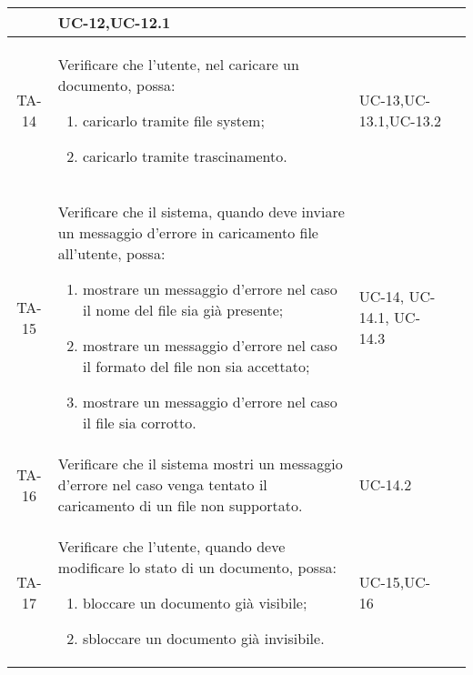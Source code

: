 \begin{xltabular}{\textwidth}{| c | X | X | c |}
\begin{enumerate}
    \end{enumerate}& UC-12,\newline UC-12.1 & \textcolor{cmarkcolor}{} \\
    \hline
    TA-14 & Verificare che l’utente, nel caricare un documento, possa:
    \begin{enumerate}
        \item caricarlo tramite file system;
        \item caricarlo tramite trascinamento.
    \end{enumerate}& UC-13,\newline UC-13.1,\newline UC-13.2 & \textcolor{cmarkcolor}{} \\
    \hline
    TA-15 & Verificare che il sistema, quando deve inviare un messaggio d'errore in caricamento file all'utente, possa:
    \begin{enumerate}
        \item mostrare un messaggio d'errore nel caso il nome del file sia già presente;
        \item mostrare un messaggio d'errore nel caso il formato del file non sia accettato;
        \item mostrare un messaggio d'errore nel caso il file sia corrotto.
        
    \end{enumerate}& UC-14, \newline UC-14.1, \newline UC-14.3 & \textcolor{xmarkcolor}{} \\
    \hline
    TA-16 & Verificare che il sistema mostri un messaggio d'errore nel caso venga tentato il caricamento di un file non supportato.& UC-14.2 & \textcolor{cmarkcolor}{} \\
    \hline

    TA-17 & Verificare che l’utente, quando deve modificare lo stato di un documento, possa:
    \begin{enumerate}
        \item bloccare un documento già visibile;
        \item sbloccare un documento già invisibile.
    \end{enumerate}& UC-15,\newline UC-16 & \textcolor{cmarkcolor}{} \\
    \hline
    

\end{xltabular}
